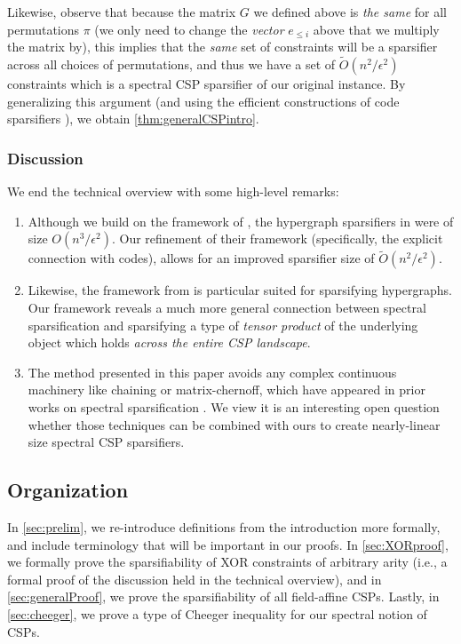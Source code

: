 \documentclass[11pt]{article}
\theoremstyle{definition}
\newcommand{\eps}{\epsilon}
\begin{document}
Likewise, observe that because the matrix $G$ we defined above is \emph{the same} for all permutations $\pi$ (we only need to change the \emph{vector} $e_{\leq i}$ above that we multiply the matrix by), this implies that the \emph{same} set of constraints will be a sparsifier across all choices of permutations, and thus we have a set of $\widetilde{O}(n^2 / \eps^2)$ constraints which is a spectral CSP sparsifier of our original instance. By generalizing this argument (and using the efficient constructions of code sparsifiers \cite{KPS24c}), we obtain \cref{thm:generalCSPintro}.

\subsubsection{Discussion}

We end the technical overview with some high-level remarks:

\begin{enumerate}
    \item Although we build on the framework of \cite{SY19}, the hypergraph sparsifiers in \cite{SY19} were of size $O(n^3 / \eps^2)$. Our refinement of their framework (specifically, the explicit connection with codes), allows for an improved sparsifier size of $\widetilde{O}(n^2 / \eps^2)$. 
    \item Likewise, the framework from \cite{SY19} is particular suited for sparsifying hypergraphs. Our framework reveals a much more general connection between spectral sparsification and sparsifying a type of \emph{tensor product} of the underlying object which holds \emph{across the entire CSP landscape}.
\item The method presented in this paper avoids any complex continuous machinery like chaining or matrix-chernoff, which have appeared in prior works on spectral sparsification \cite{KKTY21a, KKTY21b, JLLS23}. We view it is an interesting open question whether those techniques can be combined with ours to create nearly-linear size spectral CSP sparsifiers.
\end{enumerate}

\subsection{Organization}

In \cref{sec:prelim}, we re-introduce definitions from the introduction more formally, and include terminology that will be important in our proofs. In \cref{sec:XORproof}, we formally prove the sparsifiability of XOR constraints of arbitrary arity (i.e., a formal proof of the discussion held in the technical overview), and in \cref{sec:generalProof}, we prove the sparsifiability of all field-affine CSPs. Lastly, in \cref{sec:cheeger}, we prove a type of Cheeger inequality for our spectral notion of CSPs.
\end{document}
